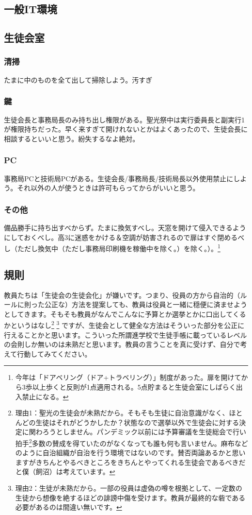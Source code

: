 \documentclass[dvipdfmx,jb5]{jarticle}
\begin{document}
\subsection{一般IT環境}
\subsection{生徒会室}
\subsubsection{清掃}
たまに中のものを全て出して掃除しよう。汚すぎ
\subsubsection{鍵}
生徒会長と事務局長のみ持ち出し権限がある。聖光祭中は実行委員長と副実行1が権限持ちだった。早く来すぎて開けれないとかはよくあったので、生徒会長に相談するといいと思う。紛失するなよ絶対。
\subsubsection{PC}
事務局PCと技術局PCがある。生徒会長/事務局長/技術局長以外使用禁止にしよう。それ以外の人が使うときは許可もらってからがいいと思う。
\subsubsection{その他}
備品勝手に持ち出すべからず。たまに換気すべし。天窓を開けて侵入できるようにしておくべし。高3に迷惑をかける＆空調が妨害されるので扉はすぐ閉めるべし（ただし換気中（ただし事務局印刷機を稼働中を除く。）を除く。）。\footnote{今年は「ドアベリング（ドア+トラベリング）」制度があった。扉を開けてから3歩以上歩くと反則が1点適用される。5点貯まると生徒会室にしばらく出入禁止になる。}
\subsection{規則}
教員たちは「生徒会の生徒会化」が嫌いです。つまり、役員の方から自治的（ルールに則った公正な）方法を提案しても、教員は役員と一緒に穏便に済ませようとしてきます。そもそも教員がなんでこんなに予算とか選挙とかに口出してくるかというはなし\footnote{理由1：聖光の生徒会が未熟だから。そもそも生徒に自治意識がなく、ほとんどの生徒はそれがどうかしたか？状態なので選挙以外で生徒会に対する決定に関わろうとしません。パンデミック以前には予算審議を生徒総会で行い拍手\footnote{起立にしろよ}多数の賛成を得ていたのがなくなっても誰も何も言いません。麻布などのように自治組織が自治を行う環境ではないのです。賛否両論あるかと思いますがきちんとやるべきところをきちんとやってくれる生徒会であるべきだと僕（飼沼）は考えています。} \footnote{理由2：生徒が未熟だから。一部の役員は虚偽の噂を根拠として、一定数の生徒から想像を絶するほどの誹謗中傷を受けます。教員が最終的な砦である必要があるのは間違い無いです。} ですが、生徒会として健全な方法はそういった部分を公正に行えることかと思います。こういった所謂進学校で生徒手帳に載っているレベルの会則しか無いのは未熟だと思います。教員の言うことを真に受けず、自分で考えて行動してみてください。
\end{document}

